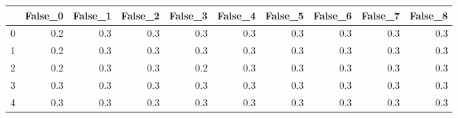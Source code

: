 \begin{tabular}{lrrrrrrrrr}
\toprule
{} &  False\_0 &  False\_1 &  False\_2 &  False\_3 &  False\_4 &  False\_5 &  False\_6 &  False\_7 &  False\_8 \\ \hline
\midrule
0 &      0.2 &      0.3 &      0.3 &      0.3 &      0.3 &      0.3 &      0.3 &      0.3 &      0.3 \\ \hline
1 &      0.2 &      0.3 &      0.3 &      0.3 &      0.3 &      0.3 &      0.3 &      0.3 &      0.3 \\ \hline
2 &      0.2 &      0.3 &      0.3 &      0.2 &      0.3 &      0.3 &      0.3 &      0.3 &      0.3 \\ \hline
3 &      0.3 &      0.3 &      0.3 &      0.3 &      0.3 &      0.3 &      0.3 &      0.3 &      0.3 \\ \hline
4 &      0.3 &      0.3 &      0.3 &      0.3 &      0.3 &      0.3 &      0.3 &      0.3 &      0.3 \\ \hline
\bottomrule
\end{tabular}
